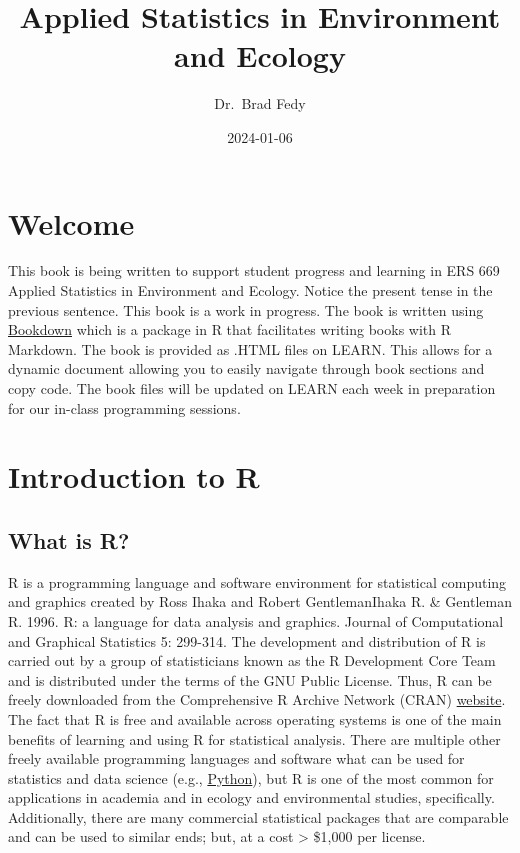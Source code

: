 \documentclass[
]{book}
\title{Applied Statistics in Environment and Ecology}
\author{Dr.~Brad Fedy}
\date{2024-01-06}
\begin{document}
\maketitle

{
\setcounter{tocdepth}{1}
\tableofcontents
}
\hypertarget{welcome}{%
\chapter{Welcome}\label{welcome}}

This book is being written to support student progress and learning in ERS 669 Applied Statistics in Environment and Ecology. Notice the present tense in the previous sentence. This book is a work in progress. The book is written using \href{https://bookdown.org/}{Bookdown} which is a package in R that facilitates writing books with R Markdown. The book is provided as .HTML files on LEARN. This allows for a dynamic document allowing you to easily navigate through book sections and copy code. The book files will be updated on LEARN each week in preparation for our in-class programming sessions.

\hypertarget{introduction-to-r}{%
\chapter{Introduction to R}\label{introduction-to-r}}

\hypertarget{what-is-r}{%
\section{What is R?}\label{what-is-r}}

R is a programming language and software environment for statistical computing and graphics created by Ross Ihaka and Robert GentlemanIhaka R. \& Gentleman R. 1996. R: a language for data analysis and graphics. Journal of Computational and Graphical Statistics 5: 299-314. The development and distribution of R is carried out by a group of statisticians known as the R Development Core Team and is distributed under the terms of the GNU Public License. Thus, R can be freely downloaded from the Comprehensive R Archive Network (CRAN) \href{http://www.r-project.org}{website}. The fact that R is free and available across operating systems is one of the main benefits of learning and using R for statistical analysis. There are multiple other freely available programming languages and software what can be used for statistics and data science (e.g., \href{https://www.python.org/}{Python}), but R is one of the most common for applications in academia and in ecology and environmental studies, specifically. Additionally, there are many commercial statistical packages that are comparable and can be used to similar ends; but, at a cost \textgreater{} \$1,000 per license.
\end{document}
